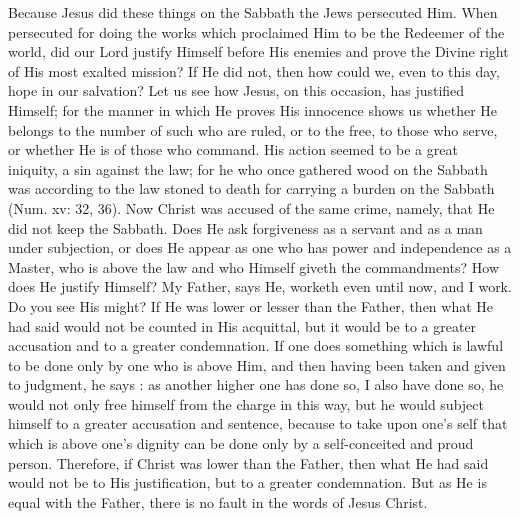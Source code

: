 Because Jesus did these things on the Sabbath
the Jews persecuted Him. When persecuted
for doing the works which proclaimed Him 
to be the Redeemer of the world, did our Lord 
justify Himself before His enemies and prove 
the Divine right of His most exalted mission? 
If He did not, then how could we, even to this 
day, hope in our salvation? Let us see how 
Jesus, on this occasion, has justified Himself; 
for the manner in which He proves His innocence
shows us whether He belongs to the number
of such who are ruled, or to the free, to 
those who serve, or whether He is of those who 
command. His action seemed to be a great 
iniquity, a sin against the law; for he who once 
gathered wood on the Sabbath was according to 
the law stoned to death for carrying a burden on 
the Sabbath (Num. xv: 32, 36). Now Christ was 
accused of the same crime, namely, that He did 
not keep the Sabbath. Does He ask forgiveness 
as a servant and as a man under subjection, or 
does He appear as one who has power and independence
as a Master, who is above the law and
who Himself giveth the commandments? How 
does He justify Himself? My Father, says He, 
worketh even until now, and I work. Do you 
see His might? If He was lower or lesser than 
the Father, then what He had said would not be 
counted in His acquittal, but it would be to a 
greater accusation and to a greater condemnation.
If one does something which is lawful to 
be done only by one who is above Him, and then 
having been taken and given to judgment, he 
says : as another higher one has done so, I also 
have done so, he would not only free himself 
from the charge in this way, but he would subject
himself to a greater accusation and sentence, 
because to take upon one's self that which is 
above one's dignity can be done only by a self-conceited
and proud person. Therefore, if Christ 
was lower than the Father, then what He had 
said would not be to His justification, but to a 
greater condemnation. But as He is equal with 
the Father, there is no fault in the words of 
Jesus Christ. 

